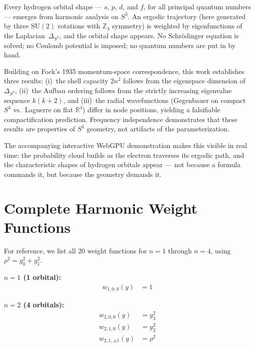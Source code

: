 \documentclass[12pt, a4paper]{article}
\theoremstyle{definition}
\theoremstyle{remark}
\newcommand{\Sthree}{S^3}
\newcommand{\SU}{\mathrm{SU}(2)}
\newcommand{\R}{\mathbb{R}}
\newcommand{\Z}{\mathbb{Z}}
\newcommand{\lap}{\Delta_{\Sthree}}
\begin{document}
Every hydrogen orbital shape --- $s$, $p$, $d$, and $f$, for all principal
quantum numbers --- emerges from harmonic analysis on $\Sthree$. An ergodic
trajectory (here generated by three $\SU$ rotations with $\Z_3$ symmetry)
is weighted by eigenfunctions of the Laplacian~$\lap$, and the orbital
shape appears. No Schr\"odinger equation is solved; no Coulomb potential is
imposed; no quantum numbers are put in by hand.

Building on Fock's 1935 momentum-space correspondence, this work establishes
three results: (i)~the shell capacity $2n^2$ follows from the eigenspace
dimension of~$\lap$, (ii)~the Aufbau ordering follows from the strictly
increasing eigenvalue sequence $k(k{+}2)$, and (iii)~the radial
wavefunctions (Gegenbauer on compact $\Sthree$ vs.\ Laguerre on flat
$\R^3$) differ in node positions, yielding a falsifiable compactification
prediction. Frequency independence demonstrates that these results are
properties of $\Sthree$ geometry, not artifacts of the parameterization.

The accompanying interactive WebGPU demonstration makes this visible in real
time: the probability cloud builds as the electron traverses its ergodic
path, and the characteristic shapes of hydrogen orbitals appear --- not
because a formula commands it, but because the geometry demands it.


\appendix

\section{Complete Harmonic Weight Functions}
\label{app:harmonics}

For reference, we list all 20 weight functions for $n = 1$ through $n = 4$,
using $\rho^2 = y_0^2 + y_1^2$.

\bigskip

\noindent\textbf{$n = 1$ (1 orbital):}
\begin{align*}
  w_{1,0,0}(y) &= 1
\end{align*}

\noindent\textbf{$n = 2$ (4 orbitals):}
\begin{align*}
  w_{2,0,0}(y) &= y_3^2 \\
  w_{2,1,0}(y) &= y_2^2 \\
  w_{2,1,\pm1}(y) &= \rho^2
\end{align*}
\end{document}

